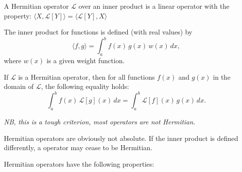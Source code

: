 \documentclass{report}
\begin{document}
A Hermitian operator $\mathcal{L}$ over an inner product is a linear operator with the property: $\langle X, \mathcal{L}[Y]\rangle=\langle\mathcal{L}[Y], X\rangle$

The inner product for functions is defined (with real values) by
\[
\langle f, g \rangle = \int_a^b f(x)\, g(x)\, w(x) \, dx,
\]
where \(w(x)\) is a given weight function. 

If \(\mathcal{L}\) is a Hermitian operator, then for all functions \(f(x)\) and \(g(x)\) in the domain of \(\mathcal{L}\), the following equality holds:
\[
\int_a^b f(x)\, \mathcal{L}[g](x) \, dx = \int_a^b \mathcal{L}[f](x)\, g(x) \, dx.
\]

\emph{NB, this is a tough criterion, most operators are not Hermitian.}

Hermitian operators are obviously not absolute. If the inner product is defined differently, a operator may cease to be Hermitian.

Hermitian operators have the following properties:
\end{document}
